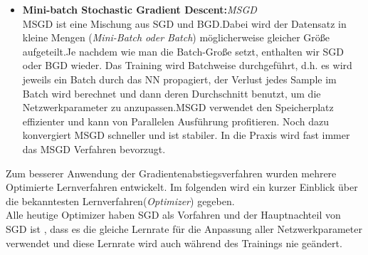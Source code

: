 \documentclass[12pt,a4paper]{scrartcl}
\numberwithin{equation}{section}
\begin{document}
\begin{itemize}
	\item \textbf{Mini-batch Stochastic Gradient Descent:}\textit{MSGD}\\
		MSGD ist eine Mischung aus SGD und BGD.Dabei wird der Datensatz in kleine Mengen (\textit{Mini-Batch oder Batch}) möglicherweise gleicher Größe aufgeteilt.Je nachdem wie man die Batch-Große setzt, enthalten wir SGD oder BGD wieder. Das Training wird Batchweise durchgeführt, d.h. es wird jeweils ein Batch durch das \ac{NN} propagiert, der Verlust jedes Sample im Batch wird berechnet und dann deren Durchschnitt benutzt, um die Netzwerkparameter zu anzupassen.MSGD verwendet den Speicherplatz effizienter und kann von Parallelen Ausführung profitieren. Noch  dazu konvergiert MSGD schneller und ist stabiler. In die Praxis wird fast immer das MSGD Verfahren bevorzugt.
\end{itemize}
Zum besserer Anwendung der Gradientenabstiegsverfahren wurden mehrere Optimierte Lernverfahren entwickelt. Im folgenden wird ein kurzer Einblick über die bekanntesten Lernverfahren(\textit{Optimizer})  gegeben.\\
Alle heutige Optimizer haben SGD als Vorfahren und der Hauptnachteil von SGD ist , dass es die gleiche Lernrate für die Anpassung aller Netzwerkparameter verwendet und diese Lernrate wird auch während des Trainings nie geändert. 
\end{document}
